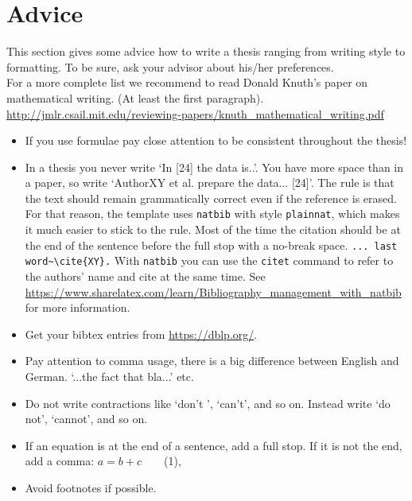 \section{Advice}\label{sec:advice}

This section gives some advice how to write a thesis ranging from writing style to formatting. To be sure, ask your advisor about his/her preferences.\\
For a more complete list we recommend to read Donald Knuth's paper on mathematical writing. (At least the first paragraph). \url{http://jmlr.csail.mit.edu/reviewing-papers/knuth_mathematical_writing.pdf}

    \begin{itemize}

        \item If you use formulae pay close attention to be consistent throughout the thesis!

        \item In a thesis you never write `In [24] the data is..'. You have more space than in a paper, so write `AuthorXY et al. prepare the data... [24]'. The rule is that the text should remain grammatically correct even if the reference is erased.
          For that reason, the template uses \texttt{natbib} with style \texttt{plainnat}, which makes it much easier to stick to the rule. Most of the time the citation should be at the end of the sentence before the full stop with a no-break space. \verb|... last word~\cite{XY}.| With \texttt{natbib} you can use the \texttt{citet} command to refer to the authors' name and cite at the same time. See \url{https://www.sharelatex.com/learn/Bibliography_management_with_natbib} for more information.
          
        \item Get your bibtex entries from \url{https://dblp.org/}.

        \item Pay attention to comma usage, there is a big difference between English and German. `...the fact that bla...' etc.

        \item Do not write contractions like `don't ', `can't', and so on. Instead write `do not', `cannot', and so on.

        \item If an equation is at the end of a sentence, add a full stop. If it is not the end, add a comma: {$a= b + c$~~~~(1),}

        \item Avoid footnotes if possible.


\end{itemize}
